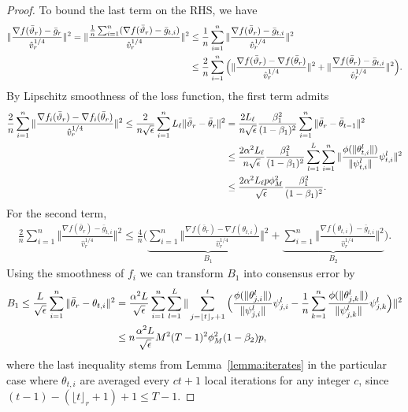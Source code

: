 \documentclass[nohyperref]{article}
\theoremstyle{plain}
\theoremstyle{definition}
\theoremstyle{remark}
\begin{document}
\begin{proof}
To bound the last term on the RHS, we have
\begin{align}\notag
    \Vert \frac{\nabla f(\bar\vartheta_r)-\bar g_r }{\hat v_r^{1/4}}\Vert^2=\Vert \frac{\frac{1}{n}\sum_{i=1}^n (\nabla f(\bar\vartheta_r)-\bar g_{t,i})}{\hat v_r^{1/4}} \Vert^2
    &\leq \frac{1}{n}\sum_{i=1}^n\Vert \frac{\nabla f(\bar\vartheta_r)-\bar g_{t,i}}{\hat v_r^{1/4}} \Vert^2\\\notag
    &\leq \frac{2}{n}\sum_{i=1}^n \Big(\Vert \frac{\nabla f(\bar\vartheta_r)-\nabla f(\bar\theta_r)}{\hat v_r^{1/4}} \Vert^2+\Vert \frac{\nabla f(\bar\theta_r)-\bar g_{t,i}}{\hat v_r^{1/4}} \Vert^2  \Big). 
\end{align}
By Lipschitz smoothness of the loss function, the first term admits
\begin{align}\notag
    \frac{2}{n}\sum_{i=1}^n\Vert \frac{\nabla f_i(\bar\vartheta_r)-\nabla f_i(\bar\theta_r)}{\hat v_r^{1/4}} \Vert^2 \leq \frac{2}{n \sqrt{\epsilon}}\sum_{i=1}^n L_\ell\Vert \bar\vartheta_r-\bar\theta_r\Vert^2 & =\frac{2L_\ell}{n \sqrt{\epsilon}}\frac{\beta_1^2}{(1-\beta_1)^2}\sum_{i=1}^n \Vert \bar\theta_r-\bar\theta_{t-1}\Vert ^2\\\notag
    &\leq \frac{2\alpha^2 L_\ell }{n \sqrt{\epsilon}}\frac{\beta_1^2}{(1-\beta_1)^2} \sum_{l=1}^L \sum_{i=1}^n\Vert \frac{\phi(\Vert \theta_{t,i}^l\Vert)}{\Vert \psi_{t,i}^l\Vert}\psi_{t,i}^l \Vert^2\\\notag
    &\leq \frac{2\alpha^2 L_\ell p\phi_M^2}{ \sqrt{\epsilon}}\frac{\beta_1^2}{(1-\beta_1)^2}.
\end{align}
For the second term,
\begin{align}\label{eq:inter}
    \frac{2}{n}\sum_{i=1}^n\Vert \frac{\nabla f(\bar\theta_r)-\bar g_{t,i}}{\hat v_r^{1/4}} \Vert^2 \leq \frac{4}{n}\Big( \underbrace{\sum_{i=1}^n \Vert \frac{\nabla f(\bar\theta_r)-\nabla f(\theta_{t,i})}{\hat v_r^{1/4}} \Vert^2}_{B_1} + \underbrace{ \sum_{i=1}^n\Vert \frac{\nabla f(\theta_{t,i})-\bar g_{t,i}}{\hat v_r^{1/4}} \Vert^2}_{B_2} \Big).
\end{align}
Using the smoothness of $f_i$ we can transform $B_1$ into consensus error by
\begin{align}\notag
    B_1\leq \frac{L}{\sqrt{\epsilon}}\sum_{i=1}^n \Vert \bar\theta_r - \theta_{t,i}\Vert^2  & =\frac{\alpha^2 L}{\sqrt{\epsilon}}\sum_{i=1}^n\sum_{l=1}^L \| \sum_{j=\lfloor t \rfloor_r+1}^t \Big( \frac{\phi(\Vert \theta_{j,i}^l\Vert)}{\Vert \psi_{j,i}^l\Vert}\psi_{j,i}^l-\frac{1}{n}\sum_{k=1}^n \frac{\phi(\Vert \theta_{j,k}^l\Vert)}{\Vert \psi_{j,k}^l\Vert}\psi_{j,k}^l \Big) \|^2\\\label{eqn:B1}
    &\leq n \frac{\alpha^2 L}{\sqrt{\epsilon}} M^2 (T-1)^2 \phi_M^2 (1-\beta_2)p,
\end{align}
where the last inequality stems from Lemma~\ref{lemma:iterates} in the particular case where $  \theta_{t,i}$ are averaged every $ct+1$ local iterations for any integer $c$, since $(t-1)-(\lfloor t \rfloor_r+1)+1 \leq T-1$.



\end{proof}
\end{document}
